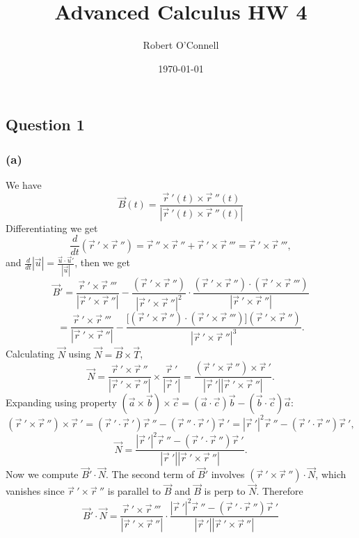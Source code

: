 \documentclass{article}
\title{\textbf{Advanced Calculus HW 4}}
\author{Robert O'Connell}
\date{\today}
\begin{document}
\maketitle
\vspace{5mm}


\subsection*{Question 1}
\subsubsection*{(a)}
We have
\[
\vec{B}(t) = \frac{\vec{r}\ '(t) \times \vec{r}\ ''(t)}{|\vec{r}\ '(t) \times \vec{r}\ ''(t)|}
\]
Differentiating we get
\[
\frac{d}{dt}(\vec{r}\ ' \times \vec{r}\ '') = \vec{r}\ '' \times \vec{r}\ '' + \vec{r}\ ' \times \vec{r}\ ''' = \vec{r}\ ' \times \vec{r}\ ''',
\]
and $\frac{d}{dt}|\vec{u}| = \frac{\vec{u} \cdot \vec{u}'}{|\vec{u}|}$, then we get
\[
\vec{B}' = \frac{\vec{r}\ ' \times \vec{r}\ '''}{|\vec{r}\ ' \times \vec{r}\ ''|}
- \frac{(\vec{r}\ ' \times \vec{r}\ '')}{|\vec{r}\ ' \times \vec{r}\ ''|^2}
\cdot
\frac{(\vec{r}\ ' \times \vec{r}\ '') \cdot (\vec{r}\ ' \times \vec{r}\ ''')}{|\vec{r}\ ' \times \vec{r}\ ''|}
\]
\[
= \frac{\vec{r}\ ' \times \vec{r}\ '''}{|\vec{r}\ ' \times \vec{r}\ ''|}
- \frac{\bigl[(\vec{r}\ ' \times \vec{r}\ '') \cdot (\vec{r}\ ' \times \vec{r}\ ''')\bigr](\vec{r}\ ' \times \vec{r}\ '')}{|\vec{r}\ ' \times \vec{r}\ ''|^3}.
\]
Calculating \(\vec{N}\) using  $\vec{N} = \vec{B} \times \vec{T}$, 
\[
\vec{N}
= \frac{\vec{r}\ ' \times \vec{r}\ ''}{|\vec{r}\ ' \times \vec{r}\ ''|}
\times \frac{\vec{r}\ '}{|\vec{r}\ '|}
= \frac{(\vec{r}\ ' \times \vec{r}\ '') \times \vec{r}\ '}{|\vec{r}\ '||\vec{r}\ ' \times \vec{r}\ ''|}.
\]
Expanding using property $(\vec{a} \times \vec{b}) \times \vec{c} = (\vec{a} \cdot \vec{c})\vec{b} - (\vec{b} \cdot \vec{c})\vec{a}$:
\[
(\vec{r}\ ' \times \vec{r}\ '') \times \vec{r}\ '
= (\vec{r}\ ' \cdot \vec{r}\ ')\vec{r}\ '' - (\vec{r}\ '' \cdot \vec{r}\ ')\vec{r}\ '
= |\vec{r}\ '|^2 \vec{r}\ '' - (\vec{r}\ ' \cdot \vec{r}\ '')\vec{r}\ ',
\]
\[
\vec{N} = \frac{|\vec{r}\ '|^2 \vec{r}\ '' - (\vec{r}\ ' \cdot \vec{r}\ '')\vec{r}\ '}{|\vec{r}\ '||\vec{r}\ ' \times \vec{r}\ ''|}.
\]
Now we compute $\vec{B}' \cdot \vec{N}$. The second term of $\vec{B}'$ involves
$(\vec{r}\ ' \times \vec{r}\ '') \cdot \vec{N}$, which vanishes since
$\vec{r}\ ' \times \vec{r}\ ''$ is parallel to $\vec{B}$ and $\vec{B}$ is perp to $\vec{N}$.
Therefore
\[
\vec{B}' \cdot \vec{N}
=
\frac{\vec{r}\ ' \times \vec{r}\ '''}{|\vec{r}\ ' \times \vec{r}\ ''|}
\cdot
\frac{|\vec{r}\ '|^2 \vec{r}\ '' - (\vec{r}\ ' \cdot \vec{r}\ '')\vec{r}\ '}
{|\vec{r}\ '||\vec{r}\ ' \times \vec{r}\ ''|}
\]
\end{document}
